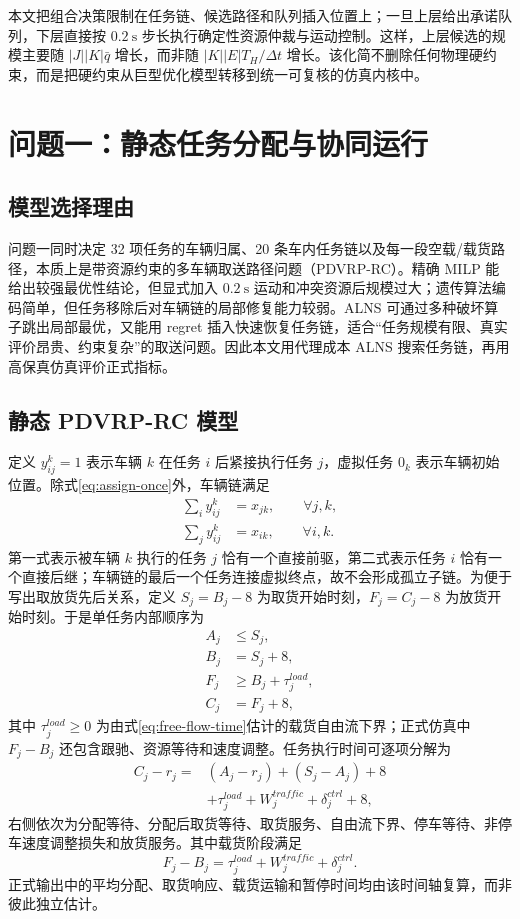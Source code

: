 \documentclass[UTF8]{ctexart}
\begin{document}
本文把组合决策限制在任务链、候选路径和队列插入位置上；一旦上层给出承诺队列，下层直接按 $0.2\ \mathrm{s}$ 步长执行确定性资源仲裁与运动控制。这样，上层候选的规模主要随 $|J||K|\bar q$ 增长，而非随 $|K||E|T_H/\Delta t$ 增长。该化简不删除任何物理硬约束，而是把硬约束从巨型优化模型转移到统一可复核的仿真内核中。

\section{问题一：静态任务分配与协同运行}
\subsection{模型选择理由}

问题一同时决定 32 项任务的车辆归属、20 条车内任务链以及每一段空载/载货路径，本质上是带资源约束的多车辆取送路径问题（PDVRP-RC）。精确 MILP 能给出较强最优性结论，但显式加入 $0.2\ \mathrm{s}$ 运动和冲突资源后规模过大；遗传算法编码简单，但任务移除后对车辆链的局部修复能力较弱。ALNS 可通过多种破坏算子跳出局部最优，又能用 regret 插入快速恢复任务链，适合“任务规模有限、真实评价昂贵、约束复杂”的取送问题\cite{ropke2006,shaw1998}。因此本文用代理成本 ALNS 搜索任务链，再用高保真仿真评价正式指标。

\subsection{静态 PDVRP-RC 模型}

定义 $y_{ij}^{k}=1$ 表示车辆 $k$ 在任务 $i$ 后紧接执行任务 $j$，虚拟任务 $0_k$ 表示车辆初始位置。除式\eqref{eq:assign-once}外，车辆链满足
\begin{align}
\sum_i y_{ij}^{k}&=x_{jk},\qquad \forall j,k,\\
\sum_j y_{ij}^{k}&=x_{ik},\qquad \forall i,k.
\end{align}
第一式表示被车辆 $k$ 执行的任务 $j$ 恰有一个直接前驱，第二式表示任务 $i$ 恰有一个直接后继；车辆链的最后一个任务连接虚拟终点，故不会形成孤立子链。为便于写出取放货先后关系，定义 $S_j=B_j-8$ 为取货开始时刻，$F_j=C_j-8$ 为放货开始时刻。于是单任务内部顺序为
\begin{align}
A_j&\le S_j,\\
B_j&=S_j+8,\\
F_j&\ge B_j+\tau_j^{load},\\
C_j&=F_j+8,
\end{align}
其中 $\tau_j^{load}\ge0$ 为由式\eqref{eq:free-flow-time}估计的载货自由流下界；正式仿真中 $F_j-B_j$ 还包含跟驰、资源等待和速度调整。任务执行时间可逐项分解为
\begin{align}\label{eq:transfer-decomposition}
C_j-r_j={}&(A_j-r_j)+(S_j-A_j)+8\\
&+\tau_j^{load}+W_j^{traffic}+\delta_j^{ctrl}+8,
\end{align}
右侧依次为分配等待、分配后取货等待、取货服务、自由流下界、停车等待、非停车速度调整损失和放货服务。其中载货阶段满足
\begin{equation}
F_j-B_j=\tau_j^{load}+W_j^{traffic}+\delta_j^{ctrl}.
\end{equation}
正式输出中的平均分配、取货响应、载货运输和暂停时间均由该时间轴复算，而非彼此独立估计。
\end{document}
